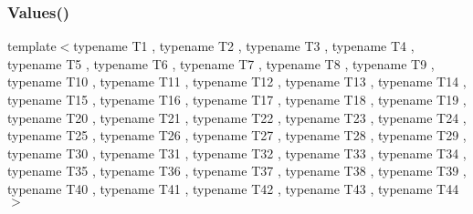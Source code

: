 \mbox{\label{namespacetesting_a42848f3794e196c5a74f4b21db0752dd}} 
\subsubsection{\texorpdfstring{Values()}{Values()}\hspace{0.1cm}{\footnotesize\ttfamily [44/50]}}
{\footnotesize\ttfamily template$<$typename T1 , typename T2 , typename T3 , typename T4 , typename T5 , typename T6 , typename T7 , typename T8 , typename T9 , typename T10 , typename T11 , typename T12 , typename T13 , typename T14 , typename T15 , typename T16 , typename T17 , typename T18 , typename T19 , typename T20 , typename T21 , typename T22 , typename T23 , typename T24 , typename T25 , typename T26 , typename T27 , typename T28 , typename T29 , typename T30 , typename T31 , typename T32 , typename T33 , typename T34 , typename T35 , typename T36 , typename T37 , typename T38 , typename T39 , typename T40 , typename T41 , typename T42 , typename T43 , typename T44 $>$ \\
}
